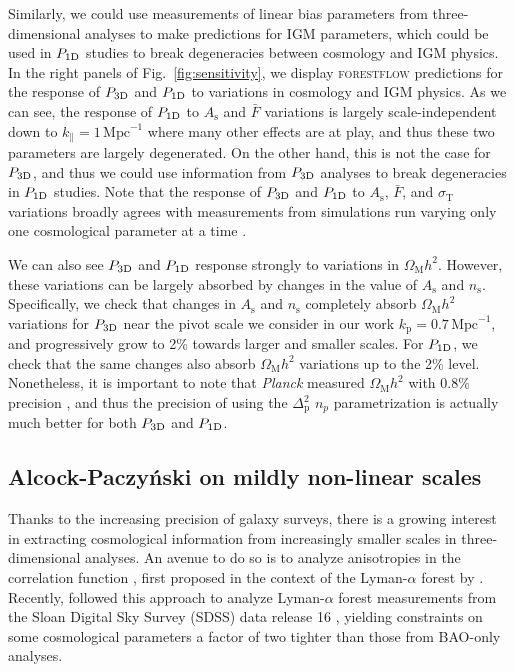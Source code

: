 \documentclass{aa}
\newcommand{\lyaf}{Lyman-$\alpha$ forest\xspace}
\newcommand{\poned}{\ensuremath{P_{\rm 1D}}\xspace}
\newcommand{\pthreed}{\ensuremath{P_{\rm 3D}}\xspace}
\newcommand{\forestflow}{\textsc{forestflow}\xspace}
\newcommand{\iMpc}{\ensuremath{\,\mathrm{Mpc}^{-1}}}
\begin{document}
Similarly, we could use measurements of linear bias parameters from three-dimensional analyses \citep{dumasdesbourboux2020CompletedSDSSIVExtended, desicollaboration2024DESI2024IV} to make predictions for IGM parameters, which could be used in \poned studies to break degeneracies between cosmology and IGM physics. In the right panels of Fig.~\ref{fig:sensitivity}, we display \forestflow predictions for the response of \pthreed and \poned to variations in cosmology and IGM physics. As we can see, the response of \poned to $A_\mathrm{s}$ and $\bar{F}$ variations is largely scale-independent down to $k_\parallel=1\iMpc$ where many other effects are at play, and thus these two parameters are largely degenerated. On the other hand, this is not the case for \pthreed, and thus we could use information from \pthreed analyses to break degeneracies in \poned studies. Note that the response of \pthreed and \poned to $A_\mathrm{s}$, $\bar{F}$, and $\sigma_\mathrm{T}$ variations broadly agrees with measurements from simulations run varying only one cosmological parameter at a time \citep{mcdonald2003MeasurementCosmologicalGeometry, mcdonald2005LinearTheoryPower}.

We can also see \pthreed and \poned response strongly to variations in $\Omega_\mathrm{M}h^2$. However, these variations can be largely absorbed by changes in the value of $A_\mathrm{s}$ and $n_\mathrm{s}$. Specifically, we check that changes in $A_\mathrm{s}$ and $n_\mathrm{s}$ completely absorb $\Omega_\mathrm{M}h^2$ variations for \pthreed near the pivot scale we consider in our work $k_\mathrm{p}=0.7\iMpc$, and progressively grow to 2\% towards larger and smaller scales. For \poned, we check that the same changes also absorb $\Omega_\mathrm{M}h^2$ variations up to the 2\% level. Nonetheless, it is important to note that {\it Planck} measured $\Omega_\mathrm{M}h^2$ with 0.8\% precision \citet{planckcollaboration2020Planck2018Resultsa}, and thus the precision of using the $\Delta^2_\mathrm{p}$ $n_p$ parametrization is actually much better for both \pthreed and \poned.
 



\subsection{Alcock-Paczy\'nski on mildly non-linear scales}

Thanks to the increasing precision of galaxy surveys, there is a growing interest in extracting cosmological information from increasingly smaller scales in three-dimensional analyses. An avenue to do so is to analyze anisotropies in the correlation function \citet[AP test;][]{alcock1979EvolutionFreeTesta}, first proposed in the context of the \lyaf by \citet{1999ApJ...518...24M, hui1999GeometricalTestCosmological}. Recently, \cite{cuceu2023ConstraintsCosmicExpansion} followed this approach to analyze \lyaf measurements from the Sloan Digital Sky Survey (SDSS) data release 16 \citep[DR16;][]{Ahumada2020_DR16}, yielding constraints on some cosmological parameters a factor of two tighter than those from BAO-only analyses. 
\end{document}
